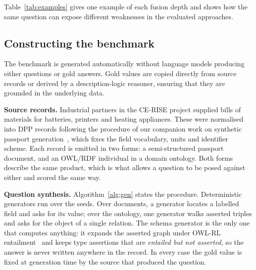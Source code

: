 \documentclass[conference]{IEEEtran}
\begin{document}
Table~\ref{tab:examples} gives one example of each fusion depth and shows how
the same question can expose different weaknesses in the evaluated approaches.

\subsection{Constructing the benchmark}
\label{sec:gen}


The benchmark is generated automatically without language models producing either questions or gold answers. Gold values are copied directly from source records or derived by a description-logic reasoner, ensuring that they are grounded in the underlying data.

\textbf{Source records.} 
Industrial partners in the CE-RISE project
supplied bills of materials for batteries, printers and heating appliances.
These were normalised into DPP records following the
procedure of our companion work on synthetic passport
generation~\cite{esfarealam2025synthdpp}, which fixes the field vocabulary,
units and identifier scheme. Each record is emitted in two forms: a
semi-structured passport document, and an OWL/RDF individual in a domain
ontology. Both forms describe the same product, which is what allows a question
to be posed against either and scored the same way.


\textbf{Question synthesis.} Algorithm~\ref{alg:gen} states the procedure.
Deterministic generators run over the seeds. Over documents, a generator locates
a labelled field and asks for its value; over the ontology, one generator walks
asserted triples and asks for the object of a single relation. The schema
generator is the only one that computes anything: it expands the asserted graph
under OWL-RL entailment~\cite{owlrl2012} and keeps type assertions that are
\emph{entailed but not asserted}, so the answer is never written anywhere in the
record. In every case the gold value is fixed at generation time by the source
that produced the question.
\end{document}
